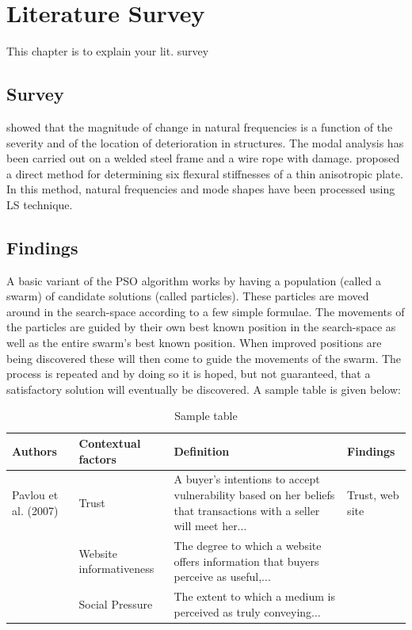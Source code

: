 \documentclass[MTech]{ugthesis}
\begin{document}
\chapter{Literature Survey}

This chapter is to explain your lit. survey
\section{Survey}
\citet{george} showed that the magnitude of change in natural frequencies is a function of the severity and of the location of deterioration in structures. The modal analysis has been carried out on a welded steel frame and a wire rope with damage. \citet{gredia} proposed a direct method for determining six flexural stiffnesses of a thin anisotropic plate. In this method, natural frequencies \citep{Leo} and mode shapes have been processed using \ac{LS} technique.
\section{Findings}
A basic variant of the \ac{PSO} \citep{kenndy} algorithm works by having a population (called a swarm) of candidate solutions (called particles). These particles are moved around in the search-space according to a few simple formulae. The movements of the particles are guided by their own best known position in the search-space as well as the entire swarm's best known position. When improved positions are being discovered these will then come to guide the movements of the swarm. The process is repeated and by doing so it is hoped, but not guaranteed, that a satisfactory solution will eventually be discovered.
A sample table is given below:

\begin{table}[htpb]
\small
\renewcommand{\arraystretch}{1.5}
\caption{Sample table}
  \label{tab1}
\begin{tabular}{|p{2cm}|p{3cm}|p{4cm}|p{4cm}|}
\hline
Authors & Contextual factors & Definition & Findings\\ \hline
Pavlou et al. (2007) & Trust & A buyer's intentions to accept vulnerability based on her beliefs that transactions with a seller will meet her... & Trust, web site\\
& Website informativeness & The degree to which a website offers information that buyers perceive as useful,... & \\
& Social Pressure & The extent to which a medium is perceived as truly conveying... & \\ \hline
\end{tabular}
\end{table}
\end{document}
